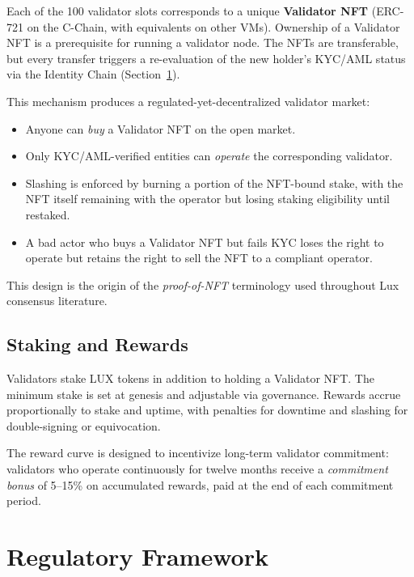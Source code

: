 \documentclass[11pt,a4paper]{article}
\begin{document}
Each of the 100 validator slots corresponds to a unique
\textbf{Validator NFT} (ERC-721 on the C-Chain, with equivalents on
other VMs). Ownership of a Validator NFT is a prerequisite for
running a validator node. The NFTs are transferable, but every
transfer triggers a re-evaluation of the new holder's KYC/AML status
via the Identity Chain (Section~\ref{sec:compliance}).

This mechanism produces a regulated-yet-decentralized validator
market:

\begin{itemize}[nosep]
  \item Anyone can \emph{buy} a Validator NFT on the open market.
  \item Only KYC/AML-verified entities can \emph{operate} the
        corresponding validator.
  \item Slashing is enforced by burning a portion of the NFT-bound
        stake, with the NFT itself remaining with the operator but
        losing staking eligibility until restaked.
  \item A bad actor who buys a Validator NFT but fails KYC loses the
        right to operate but retains the right to sell the NFT to a
        compliant operator.
\end{itemize}

This design is the origin of the \emph{proof-of-NFT} terminology
used throughout Lux consensus literature.

\subsection{Staking and Rewards}

Validators stake LUX tokens in addition to holding a Validator NFT.
The minimum stake is set at genesis and adjustable via governance.
Rewards accrue proportionally to stake and uptime, with penalties
for downtime and slashing for double-signing or equivocation.

The reward curve is designed to incentivize long-term validator
commitment: validators who operate continuously for twelve months
receive a \emph{commitment bonus} of 5--15\% on accumulated rewards,
paid at the end of each commitment period.

\section{Regulatory Framework}
\label{sec:compliance}
\end{document}
